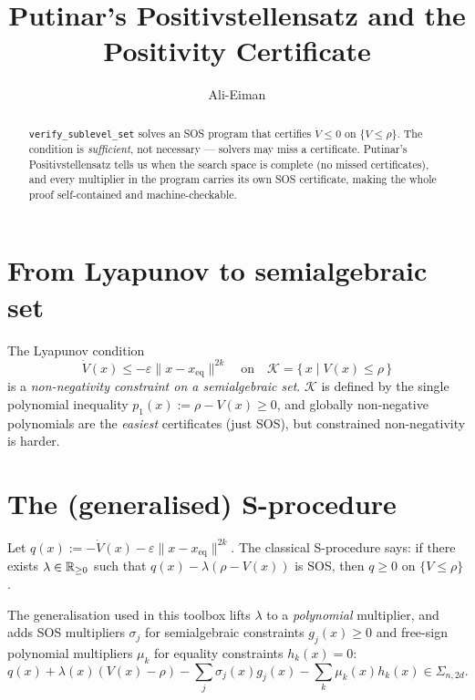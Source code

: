 \documentclass[11pt]{article}
\title{Putinar's Positivstellensatz and the Positivity Certificate}
\author{Ali-Eiman}
\date{}
\begin{document}
\maketitle

\begin{abstract}
\texttt{verify\_sublevel\_set} solves an SOS program that certifies $\dot{V} \le 0$
on $\{V \le \rho\}$. The condition is \emph{sufficient}, not necessary —
solvers may miss a certificate. Putinar's Positivstellensatz tells us when
the search space is complete (no missed certificates), and every multiplier in
the program carries its own SOS certificate, making the whole proof
self-contained and machine-checkable.
\end{abstract}

\section{From Lyapunov to semialgebraic set}

The Lyapunov condition
\begin{equation}
  \dot{V}(x) \le -\varepsilon\|x - x_{\mathrm{eq}}\|^{2k}
  \quad \text{on} \quad
  \mathcal{K} = \{\, x \mid V(x) \le \rho \,\}
\end{equation}
is a \emph{non-negativity constraint on a semialgebraic set}. $\mathcal{K}$
is defined by the single polynomial inequality $p_1(x) := \rho - V(x) \ge 0$,
and globally non-negative polynomials are the \emph{easiest} certificates
(just SOS), but constrained non-negativity is harder.

\section{The (generalised) S-procedure}

Let $q(x) := -\dot{V}(x) - \varepsilon\|x - x_{\mathrm{eq}}\|^{2k}$. The
classical S-procedure says: if there exists $\lambda \in \mathbb{R}_{\ge 0}$ such
that $q(x) - \lambda(\rho - V(x))$ is SOS, then $q \ge 0$ on $\{V \le \rho\}$.

The generalisation used in this toolbox lifts $\lambda$ to a \emph{polynomial}
multiplier, and adds SOS multipliers $\sigma_j$ for semialgebraic constraints
$g_j(x) \ge 0$ and free-sign polynomial multipliers $\mu_k$ for equality
constraints $h_k(x) = 0$:
\begin{equation}\label{eq:putinar}
  q(x) + \lambda(x)(V(x) - \rho)
  - \sum_{j} \sigma_j(x) g_j(x)
  - \sum_{k} \mu_k(x) h_k(x)
  \in \Sigma_{n,2d}.
\end{equation}
\end{document}
